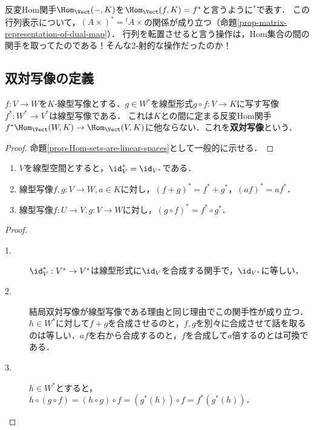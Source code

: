 \documentclass[uplatex, dvipdfmx]{jsreport}
\begin{document}
\begin{tcolorbox}[colframe=ForestGreen, colback=ForestGreen!10!white, breakable]
    反変Hom関手$\Hom_\Vect(-,K)$を$\Hom_\Vect(f,K)=f^*$と言うように${}^*$で表す．
    この行列表示について，$(A\times)^*={}^t\!A\times$の関係が成り立つ（命題\ref{prop-matrix-representation-of-dual-map}）．
    行列を転置させると言う操作は，Hom集合の間の関手を取ってたのである！そんな2-射的な操作だったのか！
\end{tcolorbox}

\subsection{双対写像の定義}

\begin{proposition}
    $f:V\to W$を$K$-線型写像とする．$g\in W^*$を線型形式$g\circ f:V\to K$に写す写像$f^*:W^*\to V^*$は線型写像である．
    これは$K$との間に定まる反変Hom関手$f^*\Hom_\Vect(W,K)\to\Hom_\Vect(V,K)$に他ならない．これを\textbf{双対写像}という．
\end{proposition}
\begin{proof}
    命題\ref{prop-Hom-sets-are-linear-spaces}として一般的に示せる．
\end{proof}

\begin{proposition}\mbox{}\label{prop-Hom-K-is-contravariant}
    \begin{enumerate}
        \item $V$を線型空間とすると，$\id^*_V=\id_{V^*}$である．
        \item 線型写像$f,g:V\to W,a\in K$に対し，$(f+g)^*=f^*+g^*$，$(af)^*=af^*$．
        \item 線型写像$f:U\to V,g:V\to W$に対し，$(g\circ f)^*=f^*\circ g^*$．
    \end{enumerate}
\end{proposition}
\begin{proof}\mbox{}
    \begin{description}
        \item[1.] $\id^*_V:V^*\to V^*$は線型形式に$\id_V$を合成する関手で，$\id_{V^*}$に等しい．
        \item[2.] 結局双対写像が線型写像である理由と同じ理由でこの関手性が成り立つ．$h\in W^*$に対して$f+g$を合成させるのと，$f,g$を別々に合成させて話を取るのは等しい．$af$を右から合成するのと，$f$を合成して$a$倍するのとは可換である．
        \item[3.] $h\in W^*$とすると，$h\circ(g\circ f)=(h\circ g)\circ f=(g^*(h))\circ f=f^*(g^*(h))$．
    \end{description}
\end{proof}
\end{document}

